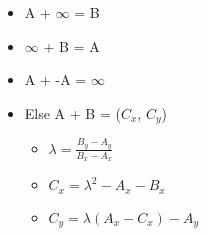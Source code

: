 \begin{itemize}
    \item[] A + $\infty$ = B
    \item[] $\infty$ + B = A
    \item[] A + -A = $\infty$
    \item[] Else A + B = ($C_x$, $C_y$)
    \begin{itemize}
        \item[] $\lambda = \frac{B_y - A_y} {B_x - A_x}$
        \item[] $C_x = \lambda^2 - A_x - B_x$
        \item[] $C_y = \lambda(A_x - C_x) - A_y$
    \end{itemize}
\end{itemize}

